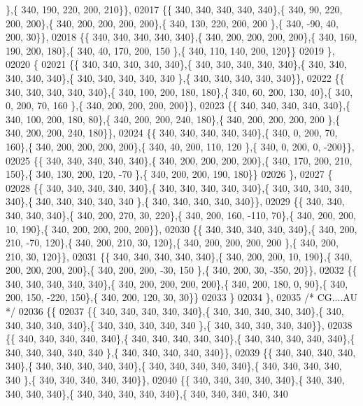 \begin{DoxyCode}
      \},\{ 340, 190, 220, 200, 210\}\},
02017 \{\{ 340, 340, 340, 340, 340\},\{ 340,  90, 220, 200, 200\},\{ 340, 200, 200, 200, 200\},\{ 340, 130, 220, 200, 200
      \},\{ 340, -90,  40, 200,  30\}\},
02018 \{\{ 340, 340, 340, 340, 340\},\{ 340, 200, 200, 200, 200\},\{ 340, 160, 190, 200, 180\},\{ 340,  40, 170, 200, 150
      \},\{ 340, 110, 140, 200, 120\}\}
02019 \},
02020 \{
02021 \{\{ 340, 340, 340, 340, 340\},\{ 340, 340, 340, 340, 340\},\{ 340, 340, 340, 340, 340\},\{ 340, 340, 340, 340, 340
      \},\{ 340, 340, 340, 340, 340\}\},
02022 \{\{ 340, 340, 340, 340, 340\},\{ 340, 100, 200, 180, 180\},\{ 340,  60, 200, 130,  40\},\{ 340,   0, 200,  70, 160
      \},\{ 340, 200, 200, 200, 200\}\},
02023 \{\{ 340, 340, 340, 340, 340\},\{ 340, 100, 200, 180,  80\},\{ 340, 200, 200, 240, 180\},\{ 340, 200, 200, 200, 200
      \},\{ 340, 200, 200, 240, 180\}\},
02024 \{\{ 340, 340, 340, 340, 340\},\{ 340,   0, 200,  70, 160\},\{ 340, 200, 200, 200, 200\},\{ 340,  40, 200, 110, 120
      \},\{ 340,   0, 200,   0, -200\}\},
02025 \{\{ 340, 340, 340, 340, 340\},\{ 340, 200, 200, 200, 200\},\{ 340, 170, 200, 210, 150\},\{ 340, 130, 200, 120, -70
      \},\{ 340, 200, 200, 190, 180\}\}
02026 \},
02027 \{
02028 \{\{ 340, 340, 340, 340, 340\},\{ 340, 340, 340, 340, 340\},\{ 340, 340, 340, 340, 340\},\{ 340, 340, 340, 340, 340
      \},\{ 340, 340, 340, 340, 340\}\},
02029 \{\{ 340, 340, 340, 340, 340\},\{ 340, 200, 270,  30, 220\},\{ 340, 200, 160, -110,  70\},\{ 340, 200, 200,  10, 
      190\},\{ 340, 200, 200, 200, 200\}\},
02030 \{\{ 340, 340, 340, 340, 340\},\{ 340, 200, 210, -70, 120\},\{ 340, 200, 210,  30, 120\},\{ 340, 200, 200, 200, 200
      \},\{ 340, 200, 210,  30, 120\}\},
02031 \{\{ 340, 340, 340, 340, 340\},\{ 340, 200, 200,  10, 190\},\{ 340, 200, 200, 200, 200\},\{ 340, 200, 200, -30, 150
      \},\{ 340, 200,  30, -350,  20\}\},
02032 \{\{ 340, 340, 340, 340, 340\},\{ 340, 200, 200, 200, 200\},\{ 340, 200, 180,   0,  90\},\{ 340, 200, 150, -220, 
      150\},\{ 340, 200, 120,  30,  30\}\}
02033 \}
02034 \},
02035 \textcolor{comment}{/* CG....AU */}
02036 \{\{
02037 \{\{ 340, 340, 340, 340, 340\},\{ 340, 340, 340, 340, 340\},\{ 340, 340, 340, 340, 340\},\{ 340, 340, 340, 340, 340
      \},\{ 340, 340, 340, 340, 340\}\},
02038 \{\{ 340, 340, 340, 340, 340\},\{ 340, 340, 340, 340, 340\},\{ 340, 340, 340, 340, 340\},\{ 340, 340, 340, 340, 340
      \},\{ 340, 340, 340, 340, 340\}\},
02039 \{\{ 340, 340, 340, 340, 340\},\{ 340, 340, 340, 340, 340\},\{ 340, 340, 340, 340, 340\},\{ 340, 340, 340, 340, 340
      \},\{ 340, 340, 340, 340, 340\}\},
02040 \{\{ 340, 340, 340, 340, 340\},\{ 340, 340, 340, 340, 340\},\{ 340, 340, 340, 340, 340\},\{ 340, 340, 340, 340, 340

\end{DoxyCode}
